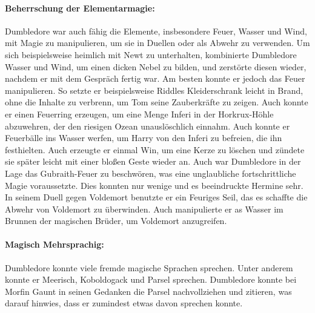 \documentclass[a4paper, 10pt]{article}
\begin{document}
\paragraph{Beherrschung der Elementarmagie:}
Dumbledore war auch fähig die Elemente, insbesondere Feuer, Wasser und Wind, mit Magie zu manipulieren, um sie in Duellen oder als Abwehr zu verwenden. Um sich beispielsweise heimlich mit Newt zu unterhalten, kombinierte Dumbledore Wasser und Wind, um einen dicken Nebel zu bilden, und zerstörte diesen wieder, nachdem er mit dem Gespräch fertig war. Am besten konnte er jedoch das Feuer manipulieren. So setzte er beispielsweise Riddles Kleiderschrank leicht in Brand, ohne die Inhalte zu verbrenn, um Tom seine Zauberkräfte zu zeigen. Auch konnte er einen Feuerring erzeugen, um eine Menge Inferi in der Horkrux-Höhle abzuwehren, der den riesigen Ozean unauslöschlich einnahm. Auch konnte er Feuerbälle ins Wasser werfen, um Harry von den Inferi zu befreien, die ihn festhielten. Auch erzeugte er einmal Win, um eine Kerze zu löschen und zündete sie später leicht mit einer bloßen Geste wieder an. Auch war Dumbledore in der Lage das Gubraith-Feuer zu beschwören, was eine unglaubliche fortschrittliche Magie voraussetzte. Dies konnten nur wenige und es beeindruckte Hermine sehr. In seinem Duell gegen Voldemort benutzte er ein Feuriges Seil, das es schaffte die Abwehr von Voldemort zu überwinden. Auch manipulierte er as Wasser im Brunnen der magischen Brüder, um Voldemort anzugreifen.
\paragraph{Magisch Mehrsprachig:}
Dumbledore konnte viele fremde magische Sprachen sprechen. Unter anderem konnte er Meerisch, Koboldogack und Parsel sprechen. Dumbledore konnte bei Morfin Gaunt in seinen Gedanken die Parsel nachvollziehen und zitieren, was darauf hinwies, dass er zumindest etwas davon sprechen konnte.
\end{document}
